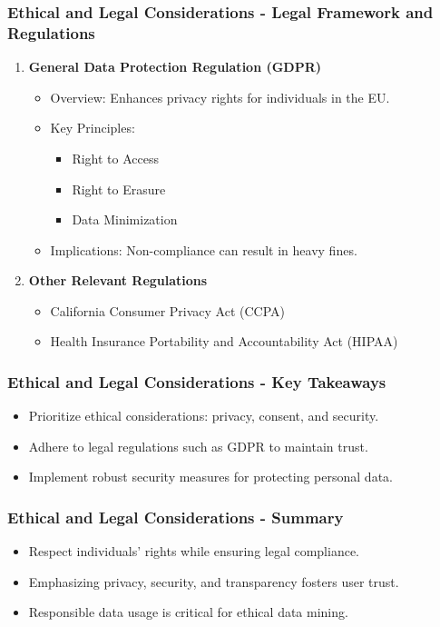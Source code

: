 \documentclass{beamer}
\begin{document}
\begin{frame}[fragile]
    \frametitle{Ethical and Legal Considerations - Legal Framework and Regulations}
    \begin{enumerate}
        \item \textbf{General Data Protection Regulation (GDPR)}
        \begin{itemize}
            \item Overview: Enhances privacy rights for individuals in the EU.
            \item Key Principles:
            \begin{itemize}
                \item Right to Access
                \item Right to Erasure
                \item Data Minimization
            \end{itemize}
            \item Implications: Non-compliance can result in heavy fines.
        \end{itemize}
        
        \item \textbf{Other Relevant Regulations}
        \begin{itemize}
            \item California Consumer Privacy Act (CCPA)
            \item Health Insurance Portability and Accountability Act (HIPAA)
        \end{itemize}
    \end{enumerate}
\end{frame}

\begin{frame}[fragile]
    \frametitle{Ethical and Legal Considerations - Key Takeaways}
    \begin{itemize}
        \item Prioritize ethical considerations: privacy, consent, and security.
        \item Adhere to legal regulations such as GDPR to maintain trust.
        \item Implement robust security measures for protecting personal data.
    \end{itemize}
\end{frame}

\begin{frame}[fragile]
    \frametitle{Ethical and Legal Considerations - Summary}
    \begin{itemize}
        \item Respect individuals' rights while ensuring legal compliance.
        \item Emphasizing privacy, security, and transparency fosters user trust.
        \item Responsible data usage is critical for ethical data mining.
    \end{itemize}
\end{frame}
\end{document}
